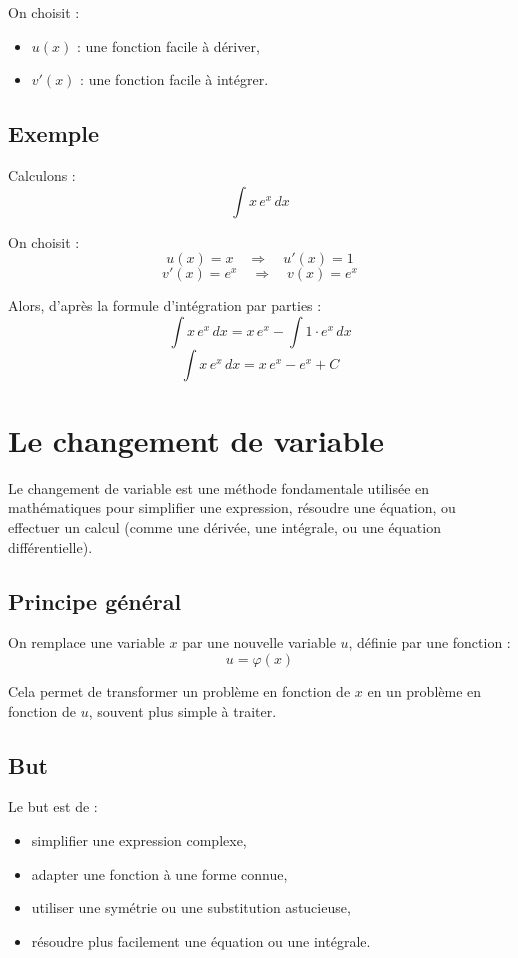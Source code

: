\documentclass[12]{article}%
\theoremstyle{plain}
\theoremstyle{definition}
\theoremstyle{remark}
\begin{document}
On choisit :
\begin{itemize}
	\item \( u(x) \) : une fonction facile à dériver,
	\item \( v'(x) \) : une fonction facile à intégrer.
\end{itemize}

\subsection*{Exemple}

Calculons :
\[
\int x\,e^x\,dx
\]

On choisit :
\[
u(x) = x \quad \Rightarrow \quad u'(x) = 1
\]
\[
v'(x) = e^x \quad \Rightarrow \quad v(x) = e^x
\]

Alors, d'après la formule d'intégration par parties :
\[
\int x\,e^x\,dx = x\,e^x - \int 1 \cdot e^x\,dx
\]
\[
\int x\,e^x\,dx = x\,e^x - e^x + C
\]

\newpage
\section{Le changement de variable}

Le changement de variable est une méthode fondamentale utilisée en mathématiques pour simplifier une expression, résoudre une équation, ou effectuer un calcul (comme une dérivée, une intégrale, ou une équation différentielle).

\subsection*{Principe général}

On remplace une variable \( x \) par une nouvelle variable \( u \), définie par une fonction :
\[
u = \varphi(x)
\]

Cela permet de transformer un problème en fonction de \( x \) en un problème en fonction de \( u \), souvent plus simple à traiter.

\subsection*{But}

Le but est de :
\begin{itemize}
	\item simplifier une expression complexe,
	\item adapter une fonction à une forme connue,
	\item utiliser une symétrie ou une substitution astucieuse,
	\item résoudre plus facilement une équation ou une intégrale.
\end{itemize}
\end{document}
